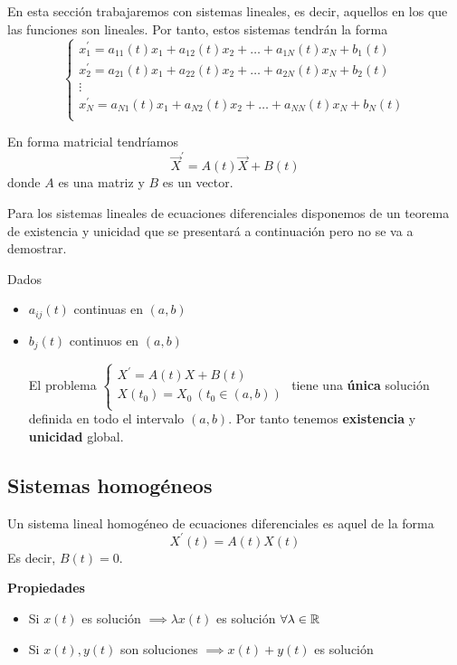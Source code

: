 \documentclass{mathnotes}
\begin{document}
En esta sección trabajaremos con sistemas lineales, es decir, aquellos en los que las funciones son lineales. Por tanto, estos sistemas tendrán la forma
\begin{equation*}
  \left\lbrace
  \begin{array}{l}
     x_1^\prime = a_{11}(t)x_1+a_{12}(t)x_2+\hdots+a_{1N}(t)x_N+b_1(t)\\
     x_2^\prime = a_{21}(t)x_1+a_{22}(t)x_2+\hdots+a_{2N}(t)x_N+b_2(t)\\
     \vdots\\
     x_N^\prime = a_{N1}(t)x_1+a_{N2}(t)x_2+\hdots+a_{NN}(t)x_N+b_N(t)\\
  \end{array}
  \right.
\end{equation*}

En forma matricial tendríamos
$$\vec{X}^\prime = A(t)\vec{X}+B(t)$$ donde $A$ es una matriz y $B$ es un vector.

Para los sistemas lineales de ecuaciones diferenciales disponemos de un teorema de existencia y unicidad que se presentará a continuación pero no se va a demostrar.

\begin{theorem}
Dados
\begin{itemize}
\item $a_{ij}(t)$ continuas en $(a,b)$
\item $b_j(t)$ continuos en $(a,b)$

El problema $
  \left\lbrace
  \begin{array}{l}
     X^\prime = A(t)X+B(t)\\
     X(t_0) = X_0\ (t_0\in(a,b))\\
  \end{array}
  \right.
$
tiene una \textbf{única} solución definida en todo el intervalo $(a,b)$. Por tanto tenemos \textbf{existencia} y \textbf{unicidad} global.
\end{itemize}
\end{theorem}

\subsection{Sistemas homogéneos}
\begin{definition}
Un sistema lineal homogéneo de ecuaciones diferenciales es aquel de la forma $$X^\prime(t) = A(t)X(t)$$ Es decir, $B(t) = 0$.
\end{definition}
\noindent\textbf{Propiedades}
\begin{itemize}
\item Si $x(t)$ es solución $\implies \lambda x(t)$ es solución $\forall \lambda \in \mathbb{R}$ 
\item Si $x(t), y(t)$ son soluciones $\implies x(t)+y(t)$ es solución
\end{itemize}
\end{document}
